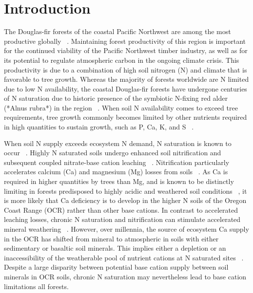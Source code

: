 
\chapter{Introduction}

The Douglas-fir forests of the coastal Pacific Northwest are among the most productive globally ~\citep{mcardleYieldDouglasFir1930,waringEvergreenConiferousForests1979, hermannDouglasfirPlantedForests1999}. Maintaining forest productivity of this region is important for the continued viability of the Pacific Northwest timber industry, as well as for its potential to regulate atmospheric carbon in the ongoing climate crisis. This productivity is due to a combination of high soil nitrogen (N) and climate that is favorable to tree growth. Whereas the majority of forests worldwide are N limited due to low N availability, the coastal Douglas-fir forests  have undergone centuries of N saturation due to historic presence of the symbiotic N-fixing red alder (*Alnus rubra*) in the region ~\citep{binkleyEcosystemProductionDouglasfir1983}. When soil N availability comes to exceed tree requirements, tree growth commonly becomes limited by other nutrients required in high quantities to sustain growth, such as P, Ca, K, and S ~\citep{mainwaringThreeyearGrowthResponse2014, perakisForestCalciumDepletion2013, turnerUseFoliageSulphate1977, radwanNutritionDouglasfir}. 

When soil N supply exceeds ecosystem N demand, N saturation is known to occur ~\citep{agrenNitrogenSaturationTerrestrial1988}. Highly N saturated soils undergo enhanced soil nitrification and subsequent coupled nitrate-base cation leaching ~\citep{perakisCoupledNitrogenCalcium2006}. Nitrification particularly accelerates calcium (Ca) and magnesium (Mg) losses from soils ~\citep{homann1994}. As Ca is required in higher quantities by trees than Mg, and is known to be distinctly limiting in forests predisposed to highly acidic and weathered soil conditions ~\citep{likensBiogeochemistryCalciumHubbard1998, federerLongtermDepletionCalcium1989, bigelowNutrientLimitationJuvenile2007}, it is more likely that Ca deficiency is to develop in the higher N soils of the Oregon Coast Range (OCR) rather than other base cations. In contrast to accelerated leaching losses, chronic N saturation and nitrification can stimulate accelerated mineral weathering ~\citep{berthelinMajorRoleNitrification1985, perakisNitrogenfixingRedAlder2019}. However, over millennia, the  source of ecosystem Ca supply in the OCR has shifted from mineral to atmospheric in soils with either sedimentary or basaltic soil minerals. This implies either a depletion or an inaccessibility of the weatherable pool of nutrient cations at N saturated sites ~\citep{hynickaNitrogenEnrichmentRegulates2016, leysNaturalAnthropogenicDrivers2016a}. Despite a large disparity between potential base cation supply between soil minerals in OCR soils, chronic N saturation may nevertheless lead to base cation limitations all forests. 

